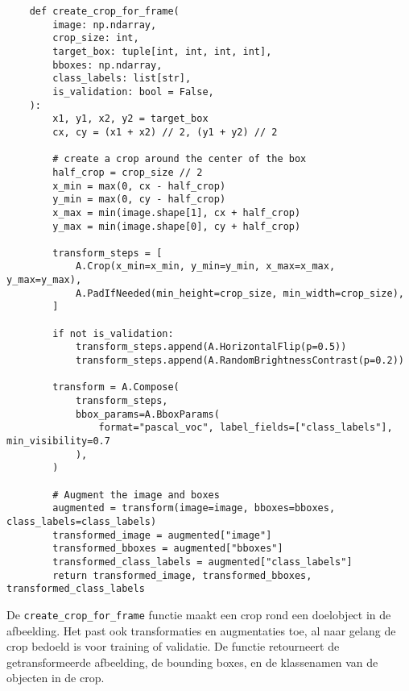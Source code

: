 \begin{listing}[H]
  \fontsize{12pt}{10pt}
  \begin{verbatim}
    def create_crop_for_frame(
        image: np.ndarray,
        crop_size: int,
        target_box: tuple[int, int, int, int],
        bboxes: np.ndarray,
        class_labels: list[str],
        is_validation: bool = False,  
    ):
        x1, y1, x2, y2 = target_box
        cx, cy = (x1 + x2) // 2, (y1 + y2) // 2

        # create a crop around the center of the box
        half_crop = crop_size // 2
        x_min = max(0, cx - half_crop)
        y_min = max(0, cy - half_crop)
        x_max = min(image.shape[1], cx + half_crop)
        y_max = min(image.shape[0], cy + half_crop)

        transform_steps = [
            A.Crop(x_min=x_min, y_min=y_min, x_max=x_max, y_max=y_max),
            A.PadIfNeeded(min_height=crop_size, min_width=crop_size),
        ]

        if not is_validation:
            transform_steps.append(A.HorizontalFlip(p=0.5))
            transform_steps.append(A.RandomBrightnessContrast(p=0.2))

        transform = A.Compose(
            transform_steps,
            bbox_params=A.BboxParams(
                format="pascal_voc", label_fields=["class_labels"], min_visibility=0.7
            ),
        )

        # Augment the image and boxes
        augmented = transform(image=image, bboxes=bboxes, class_labels=class_labels)
        transformed_image = augmented["image"]
        transformed_bboxes = augmented["bboxes"]
        transformed_class_labels = augmented["class_labels"]
        return transformed_image, transformed_bboxes, transformed_class_labels
  \end{verbatim}
  \caption[Functie voor het creëren van een crop rond een doelobject]{
    \label{listing:create-crop-frame}
    De \texttt{create\_crop\_for\_frame} functie maakt een crop rond een doelobject in de afbeelding.
    Het past ook transformaties en augmentaties toe, al naar gelang de crop bedoeld is voor training of validatie.
    De functie retourneert de getransformeerde afbeelding, de bounding boxes, en de klassenamen van de objecten in de crop.
    }
\end{listing}

